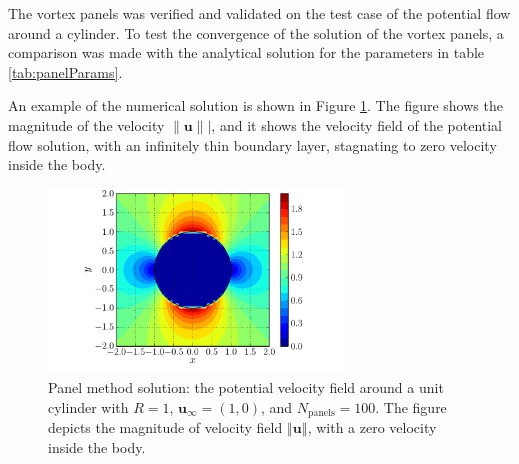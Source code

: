 The vortex panels was verified and validated on the test case of the potential flow around a cylinder. To test the 
convergence of the solution of the vortex panels, a comparison was made with the analytical solution for the parameters in table \ref{tab:panelParams}.

An example of the numerical solution is shown in Figure \ref{fig:panelCylinder_velocityField}. The figure shows the magnitude of the velocity $\lVert\mathbf{u}\rVert|$, and it shows the velocity field of the potential flow solution, with an infinitely thin boundary layer, stagnating to zero velocity inside the body.

	\begin{figure}[p]
	\centering
	\includegraphics[width=0.7\textwidth]{figures/lagrangian/panelCylinder_velocityField.pdf}
	\caption{Panel method solution: the potential velocity field around a unit cylinder with $R = 1$, $\mathbf{u}_{\infty} = (1, 0)$, and $N_{\mathrm{panels}}=100$. The figure depicts the magnitude of velocity field $\left\Vert\mathbf{u}\right\Vert$, with a zero velocity inside the body.}
	\label{fig:panelCylinder_velocityField}
	\end{figure}

